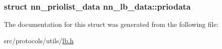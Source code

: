 \subsubsection[{priodata}]{\setlength{\rightskip}{0pt plus 5cm}struct {\bf nn\+\_\+priolist\+\_\+data} nn\+\_\+lb\+\_\+data\+::priodata}\hypertarget{structnn__lb__data_af6e25c0a43dee66626f73ae3055d4688}{}\label{structnn__lb__data_af6e25c0a43dee66626f73ae3055d4688}


The documentation for this struct was generated from the following file\+:\begin{DoxyCompactItemize}
\item 
src/protocols/utils/\hyperlink{lb_8h}{lb.\+h}\end{DoxyCompactItemize}
